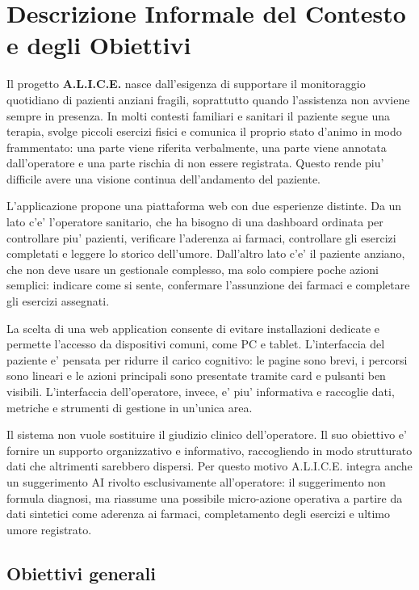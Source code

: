\section{Descrizione Informale del Contesto e degli Obiettivi}

Il progetto \textbf{A.L.I.C.E.} nasce dall'esigenza di supportare il monitoraggio quotidiano di pazienti anziani fragili, soprattutto quando l'assistenza non avviene sempre in presenza. In molti contesti familiari e sanitari il paziente segue una terapia, svolge piccoli esercizi fisici e comunica il proprio stato d'animo in modo frammentato: una parte viene riferita verbalmente, una parte viene annotata dall'operatore e una parte rischia di non essere registrata. Questo rende piu' difficile avere una visione continua dell'andamento del paziente.

L'applicazione propone una piattaforma web con due esperienze distinte. Da un lato c'e' l'operatore sanitario, che ha bisogno di una dashboard ordinata per controllare piu' pazienti, verificare l'aderenza ai farmaci, controllare gli esercizi completati e leggere lo storico dell'umore. Dall'altro lato c'e' il paziente anziano, che non deve usare un gestionale complesso, ma solo compiere poche azioni semplici: indicare come si sente, confermare l'assunzione dei farmaci e completare gli esercizi assegnati.

La scelta di una web application consente di evitare installazioni dedicate e permette l'accesso da dispositivi comuni, come PC e tablet. L'interfaccia del paziente e' pensata per ridurre il carico cognitivo: le pagine sono brevi, i percorsi sono lineari e le azioni principali sono presentate tramite card e pulsanti ben visibili. L'interfaccia dell'operatore, invece, e' piu' informativa e raccoglie dati, metriche e strumenti di gestione in un'unica area.

Il sistema non vuole sostituire il giudizio clinico dell'operatore. Il suo obiettivo e' fornire un supporto organizzativo e informativo, raccogliendo in modo strutturato dati che altrimenti sarebbero dispersi. Per questo motivo A.L.I.C.E. integra anche un suggerimento AI rivolto esclusivamente all'operatore: il suggerimento non formula diagnosi, ma riassume una possibile micro-azione operativa a partire da dati sintetici come aderenza ai farmaci, completamento degli esercizi e ultimo umore registrato.

\subsection{Obiettivi generali}

